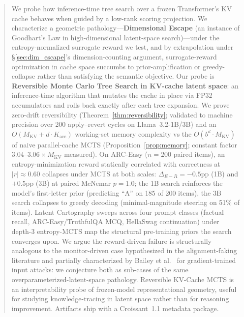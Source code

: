 \documentclass{article}
\begin{document}
\begin{abstract}
We probe how inference-time tree search over a frozen Transformer's KV cache behaves when guided by a low-rank scoring projection. We characterize a geometric pathology---\textbf{Dimensional Escape} (an instance of Goodhart's Law in high-dimensional latent-space search)---under the entropy-normalized surrogate reward we test, and by extrapolation under §\ref{sec:dim_escape}'s dimension-counting argument, surrogate-reward optimization in cache space succumbs to prior-amplification or greedy-collapse rather than satisfying the semantic objective. Our probe is \textbf{Reversible Monte Carlo Tree Search in KV-cache latent space}: an inference-time algorithm that mutates the cache in place via FP32 accumulators and rolls back exactly after each tree expansion. We prove zero-drift reversibility (Theorem~\ref{thm:reversibility}; validated to machine precision over 200 apply--revert cycles on Llama~3.2-1B/3B) and an $O(M_{\text{KV}} + d \cdot K_{\text{acc}})$ working-set memory complexity vs the $O(b^d \cdot M_{\text{KV}})$ of naive parallel-cache MCTS (Proposition~\ref{prop:memory}; constant factor $3.04$--$3.06\times M_{\text{KV}}$ measured). On ARC-Easy ($n=200$ paired items), an entropy-minimization reward statically correlated with correctness at $|r| \approx 0.60$ collapses under MCTS at both scales: $\Delta_{E-R} = -0.5$pp (1B) and $+0.5$pp (3B) at paired McNemar $p = 1.0$; the 1B search reinforces the model's first-letter prior (predicting ``A'' on 185 of 200 items), the 3B search collapses to greedy decoding (minimal-magnitude steering on 51\% of items). Latent Cartography sweeps across four prompt classes (factual recall, ARC-Easy/TruthfulQA MCQ, HellaSwag continuation) under depth-$3$ entropy-MCTS map the structural pre-training priors the search converges upon. We argue the reward-driven failure is structurally analogous to the monitor-driven case hypothesized in the alignment-faking literature and partially characterized by Bailey et al.~\cite{bailey2024obfuscated} for gradient-trained input attacks: we conjecture both as sub-cases of the same overparameterized-latent-space pathology. Reversible KV-Cache MCTS is an interpretability probe of frozen-model representational geometry, useful for studying knowledge-tracing in latent space rather than for reasoning improvement. Artifacts ship with a Croissant~1.1 metadata package.
\end{abstract}

\end{document}
